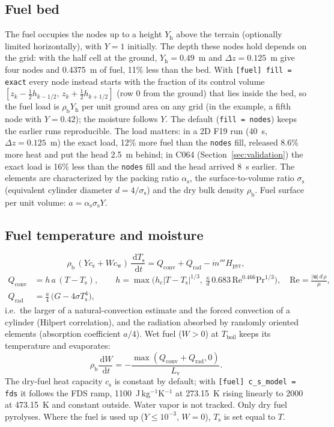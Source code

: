 \documentclass[11pt,a4paper]{article}
\newcommand{\vu}{\mathbf{u}}
\newcommand{\dd}{\,\mathrm{d}}
\newcommand{\code}[1]{\texttt{#1}}
\begin{document}
\subsection{Fuel bed}
The fuel occupies the nodes up to a height $Y_\text{h}$ above the terrain (optionally limited
horizontally), with $Y=1$ initially. The depth these nodes hold depends on the grid: with the half cell
at the ground, $Y_\text{h}=0.49$~m and $\Delta z=0.125$~m give four nodes and 0.4375~m of fuel, 11\% less
than the bed. With \code{[fuel] fill = exact} every node instead starts with the fraction of its control
volume $[z_k-\tfrac12h_{k-1/2},\,z_k+\tfrac12h_{k+1/2}]$ (row 0 from the ground) that lies inside the bed,
so the fuel load is $\rho_\text{b}Y_\text{h}$ per unit ground area on any grid (in the example, a fifth node
with $Y=0.42$); the moisture follows $Y$. The default (\code{fill = nodes}) keeps the earlier runs
reproducible. The load matters: in a 2D F19 run (40~s, $\Delta z=0.125$~m) the exact load, 12\% more fuel than
the \code{nodes} fill, released 8.6\% more heat and put the head 2.5~m behind; in C064 (Section~\ref{sec:validation})
the exact load is 16\% less than the \code{nodes} fill and the head arrived 8~s earlier. The elements are characterized by the packing ratio
$\alpha_\text{s}$, the surface-to-volume ratio $\sigma_\text{s}$ (equivalent cylinder diameter $d=4/\sigma_\text{s}$) and
the dry bulk density $\rho_\text{b}$. Fuel surface per unit volume: $a=\alpha_\text{s}\sigma_\text{s} Y$.

\subsection{Fuel temperature and moisture}
\begin{equation}\label{eq:solid}
  \rho_\text{b}\,(Y c_\text{s} + W c_\text{w})\,\frac{\dd T_\text{s}}{\dd t} = Q_\text{conv} + Q_\text{rad} - \dot m''' H_\text{pyr},
\end{equation}
\begin{align}
  Q_\text{conv} &= h\,a\,(T-T_\text{s}), \qquad
  h = \max\!\Big(h_\text{c}|T-T_\text{s}|^{1/3},\ \frac{\kappa}{d}\,0.683\,\mathrm{Re}^{0.466}\mathrm{Pr}^{1/3}\Big),
  \quad \mathrm{Re}=\frac{|\vu|\,d\,\rho}{\mu},\\
  Q_\text{rad} &= \frac{a}{4}\,\big(G-4\sigma T_\text{s}^4\big),
\end{align}
i.e.\ the larger of a natural-convection estimate and the forced convection of a cylinder
(Hilpert correlation), and the radiation absorbed by randomly oriented elements (absorption
coefficient $a/4$). Wet fuel ($W>0$) at $T_\text{boil}$ keeps its temperature and evaporates:
\begin{equation}
  \rho_\text{b}\frac{\dd W}{\dd t} = -\frac{\max(Q_\text{conv}+Q_\text{rad},0)}{L_\text{v}}.
\end{equation}
The dry-fuel heat capacity $c_\text{s}$ is constant by default; with \code{[fuel] c\_s\_model = fds} it
follows the FDS ramp, 1100~J\,kg$^{-1}$K$^{-1}$ at 273.15~K rising linearly to 2000 at 473.15~K and constant
outside. Water vapor is not tracked. Only dry fuel pyrolyses. Where the fuel is used up
($Y\le10^{-3}$, $W=0$), $T_\text{s}$ is set equal to $T$.
\end{document}
